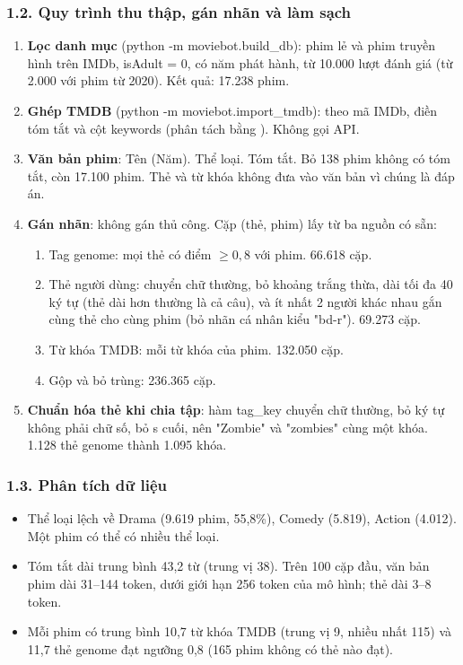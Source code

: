 \documentclass[12pt,a4paper]{article}
\providecommand{\tightlist}{\setlength{\itemsep}{0pt}\setlength{\parskip}{0pt}}
\let\oldsubsubsection\subsubsection
\renewcommand{\subsubsection}{\Needspace{10\baselineskip}\oldsubsubsection}
\begin{document}
\subsubsection{1.2. Quy trình thu thập, gán nhãn và làm sạch}

\begin{enumerate}
\def\labelenumi{\arabic{enumi}.}
\item \textbf{Lọc danh mục} (python -m moviebot.build\_db): phim lẻ và phim truyền hình trên IMDb, isAdult = 0, có năm phát hành, từ 10.000 lượt đánh giá (từ 2.000 với phim từ 2020). Kết quả: 17.238 phim.
\item \textbf{Ghép TMDB} (python -m moviebot.import\_tmdb): theo mã IMDb, điền tóm tắt và cột keywords (phân tách bằng \textbar). Không gọi API.
\item \textbf{Văn bản phim}: Tên (Năm). Thể loại. Tóm tắt. Bỏ 138 phim không có tóm tắt, còn 17.100 phim. Thẻ và từ khóa không đưa vào văn bản vì chúng là đáp án.
\item \textbf{Gán nhãn}: không gán thủ công. Cặp (thẻ, phim) lấy từ ba nguồn có sẵn:
  \begin{enumerate}
  \def\labelenumii{\alph{enumii}.}
  \item Tag genome: mọi thẻ có điểm $\geq 0{,}8$ với phim. 66.618 cặp.
  \item Thẻ người dùng: chuyển chữ thường, bỏ khoảng trắng thừa, dài tối đa 40 ký tự (thẻ dài hơn thường là cả câu), và ít nhất 2 người khác nhau gắn cùng thẻ cho cùng phim (bỏ nhãn cá nhân kiểu "bd-r"). 69.273 cặp.
  \item Từ khóa TMDB: mỗi từ khóa của phim. 132.050 cặp.
  \item Gộp và bỏ trùng: 236.365 cặp.
  \end{enumerate}
\item \textbf{Chuẩn hóa thẻ khi chia tập}: hàm tag\_key chuyển chữ thường, bỏ ký tự không phải chữ số, bỏ s cuối, nên "Zombie" và "zombies" cùng một khóa. 1.128 thẻ genome thành 1.095 khóa.
\end{enumerate}

\subsubsection{1.3. Phân tích dữ liệu}

\begin{itemize}
\tightlist
\item Thể loại lệch về Drama (9.619 phim, 55,8\%), Comedy (5.819), Action (4.012). Một phim có thể có nhiều thể loại.
\item Tóm tắt dài trung bình 43,2 từ (trung vị 38). Trên 100 cặp đầu, văn bản phim dài 31--144 token, dưới giới hạn 256 token của mô hình; thẻ dài 3--8 token.
\item Mỗi phim có trung bình 10,7 từ khóa TMDB (trung vị 9, nhiều nhất 115) và 11,7 thẻ genome đạt ngưỡng 0,8 (165 phim không có thẻ nào đạt).
\end{itemize}
\end{document}
